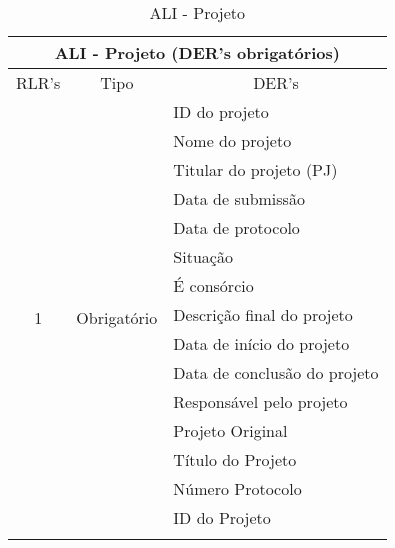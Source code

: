       \begin{table}[!h]
      \centering
      \caption{ALI - Projeto}
      \label{ali_projeto}
      \begin{tabular}{|c|c|l|}
      \hline
      \multicolumn{3}{|c|}{\textbf{ALI - Projeto (DER's obrigatórios)}}                                                      \\ \hline
      \multicolumn{1}{|l|}{RLR's} & Tipo                         & \multicolumn{1}{c|}{DER's}  \\ \hline
      \multirow{19}{*}{1}  &\multirow{19}{*}{Obrigatório} & ID do projeto               \\ \cline{3-3} 
                          &                              & Nome do projeto             \\ \cline{3-3} 
                          &                              & Titular do projeto (PJ)     \\ \cline{3-3} 
                          &                              & Data de submissão           \\ \cline{3-3} 
                          &                              & Data de protocolo           \\ \cline{3-3} 
                          &                              & Situação                    \\ \cline{3-3} 
                          &                              & É consórcio                 \\ \cline{3-3} 
                          &                              & Descrição final do projeto          \\ \cline{3-3} 
                          &                              & Data de início do projeto                  \\ \cline{3-3} 
                          &                              & Data de conclusão do projeto                 \\ \cline{3-3}
                          &                              & Responsável pelo projeto    \\ \cline{3-3}
                          &   & Projeto Original               \\ \cline{3-3}
                          &   & Título do Projeto                                   \\ \cline{3-3}
                          &   & Número Protocolo                                    \\ \cline{3-3}
                          &   & ID do Projeto                                       \\ \cline{3-3}

\end{tabular}
\end{table}
